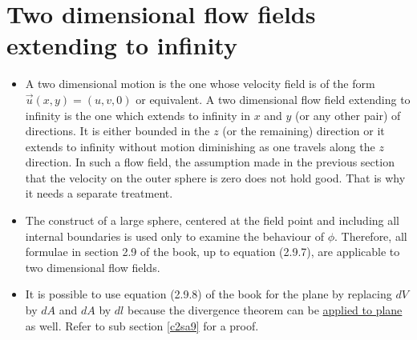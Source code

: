 \section{Two dimensional flow fields extending to infinity}\label{c2s10}
\begin{itemize}
\item A two dimensional motion is the one whose velocity field is of the form $\vec{u}(x, y) = (u, v, 0)$ or equivalent. A two dimensional flow field extending to infinity is the one
which extends to infinity in $x$ and $y$ (or any other pair) of directions. It is either bounded in the $z$ (or the remaining) direction or it extends to infinity without motion 
diminishing as one travels along the $z$ direction. In such a flow field, the assumption made in the previous section that the velocity on the outer sphere is zero does not hold good.
That is why it needs a separate treatment.

\item The construct of a large sphere, centered at the field point and including all internal boundaries is used only to examine the behaviour of $\phi$. Therefore, all formulae in 
section 2.9 of the book, up to equation (2.9.7), are applicable to two dimensional flow fields.

\item It is possible to use equation (2.9.8) of the book for the plane by replacing $dV$ by $dA$ and $dA$ by $dl$ because the divergence theorem can be \href{http://mathworld.wolfram.com/
DivergenceTheorem.html}{applied to plane} as well. Refer to sub section \ref{c2sa9} for a proof.


\end{itemize}
